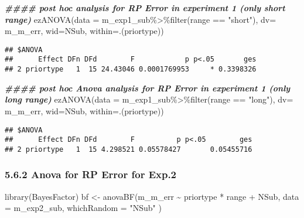 \documentclass[
]{article}
\newenvironment{Shaded}{\begin{snugshade}}{\end{snugshade}}
\newcommand{\AttributeTok}[1]{\textcolor[rgb]{0.77,0.63,0.00}{#1}}
\newcommand{\DocumentationTok}[1]{\textcolor[rgb]{0.56,0.35,0.01}{\textbf{\textit{#1}}}}
\newcommand{\FunctionTok}[1]{\textcolor[rgb]{0.00,0.00,0.00}{#1}}
\newcommand{\NormalTok}[1]{#1}
\newcommand{\OtherTok}[1]{\textcolor[rgb]{0.56,0.35,0.01}{#1}}
\newcommand{\SpecialCharTok}[1]{\textcolor[rgb]{0.00,0.00,0.00}{#1}}
\newcommand{\StringTok}[1]{\textcolor[rgb]{0.31,0.60,0.02}{#1}}
\begin{document}
\begin{Shaded}
\begin{Highlighting}[]
\DocumentationTok{\#\#\#\# post hoc analysis for RP Error in experiment 1 (only short range)}
 \FunctionTok{ezANOVA}\NormalTok{(}\AttributeTok{data =}\NormalTok{ m\_exp1\_sub}\SpecialCharTok{\%\textgreater{}\%}\FunctionTok{filter}\NormalTok{(range }\SpecialCharTok{==} \StringTok{"short"}\NormalTok{), }\AttributeTok{dv=}\NormalTok{ m\_m\_err, }\AttributeTok{wid=}\NormalTok{NSub, }\AttributeTok{within=}\NormalTok{.(priortype))}
\end{Highlighting}
\end{Shaded}

\begin{verbatim}
## $ANOVA
##      Effect DFn DFd        F            p p<.05       ges
## 2 priortype   1  15 24.43046 0.0001769953     * 0.3398326
\end{verbatim}

\begin{Shaded}
\begin{Highlighting}[]
\DocumentationTok{\#\#\#\# post hoc Anova analysis  for RP Error in experiment 1 (only long range)}
 \FunctionTok{ezANOVA}\NormalTok{(}\AttributeTok{data =}\NormalTok{ m\_exp1\_sub}\SpecialCharTok{\%\textgreater{}\%}\FunctionTok{filter}\NormalTok{(range }\SpecialCharTok{==} \StringTok{"long"}\NormalTok{), }\AttributeTok{dv=}\NormalTok{ m\_m\_err, }\AttributeTok{wid=}\NormalTok{NSub, }\AttributeTok{within=}\NormalTok{.(priortype))}
\end{Highlighting}
\end{Shaded}

\begin{verbatim}
## $ANOVA
##      Effect DFn DFd        F          p p<.05        ges
## 2 priortype   1  15 4.298521 0.05578427       0.05455716
\end{verbatim}

\hypertarget{anova-for-rp-error-for-exp.2}{%
\subsubsection{5.6.2 Anova for RP Error for
Exp.2}\label{anova-for-rp-error-for-exp.2}}

\begin{Shaded}
\begin{Highlighting}[]
\FunctionTok{library}\NormalTok{(BayesFactor) }
\NormalTok{bf }\OtherTok{\textless{}{-}} \FunctionTok{anovaBF}\NormalTok{(m\_m\_err }\SpecialCharTok{\textasciitilde{}}\NormalTok{ priortype }\SpecialCharTok{*}\NormalTok{ range }\SpecialCharTok{+}\NormalTok{ NSub, }\AttributeTok{data =}\NormalTok{ m\_exp2\_sub, }\AttributeTok{whichRandom =} \StringTok{"NSub"}\NormalTok{ ) }
\end{Highlighting}
\end{Shaded}
\end{document}
